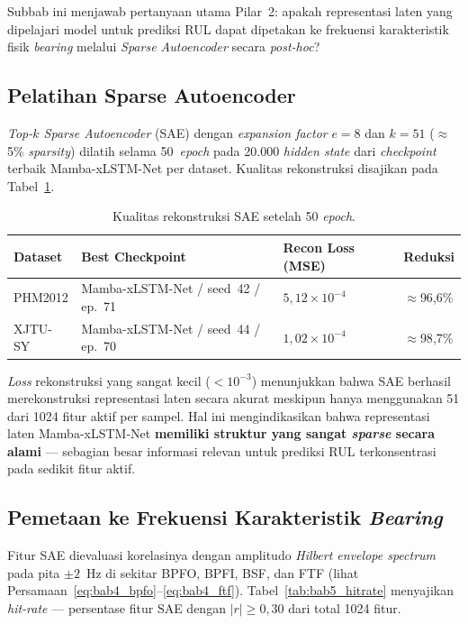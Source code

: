 Subbab ini menjawab pertanyaan utama Pilar~2: apakah representasi laten
yang dipelajari model untuk prediksi RUL dapat dipetakan ke frekuensi
karakteristik fisik \emph{bearing} melalui \emph{Sparse Autoencoder} secara
\emph{post-hoc}?

\subsection{Pelatihan Sparse Autoencoder}
\label{subsec:bab5_sae_training}

\emph{Top-$k$ Sparse Autoencoder} (SAE) dengan \emph{expansion factor}
$e = 8$ dan $k = 51$ (${\approx}$5\% \emph{sparsity}) dilatih selama
50~\emph{epoch} pada 20.000 \emph{hidden state} dari \emph{checkpoint}
terbaik Mamba-xLSTM-Net per dataset.
Kualitas rekonstruksi disajikan pada Tabel~\ref{tab:bab5_sae_recon}.

\begin{table}[ht]
\centering
\caption{Kualitas rekonstruksi SAE setelah 50 \emph{epoch}.}
\label{tab:bab5_sae_recon}
\small
\begin{tabular}{@{}llll@{}}
\toprule
\textbf{Dataset} & \textbf{Best Checkpoint} & \textbf{Recon Loss (MSE)} & \textbf{Reduksi} \\
\midrule
PHM2012  & Mamba-xLSTM-Net / seed~42 / ep.~71 & $5{,}12 \times 10^{-4}$ & $\approx$96{,}6\% \\
XJTU-SY & Mamba-xLSTM-Net / seed~44 / ep.~70 & $1{,}02 \times 10^{-4}$ & $\approx$98{,}7\% \\
\bottomrule
\end{tabular}
\end{table}

\emph{Loss} rekonstruksi yang sangat kecil ($< 10^{-3}$) menunjukkan bahwa SAE
berhasil merekonstruksi representasi laten secara akurat meskipun hanya
menggunakan 51 dari 1024 fitur aktif per sampel. Hal ini mengindikasikan
bahwa representasi laten Mamba-xLSTM-Net \textbf{memiliki struktur yang
sangat \emph{sparse} secara alami} --- sebagian besar informasi relevan
untuk prediksi RUL terkonsentrasi pada sedikit fitur aktif.

\subsection{Pemetaan ke Frekuensi Karakteristik \emph{Bearing}}
\label{subsec:bab5_bpfx}

Fitur SAE dievaluasi korelasinya dengan amplitudo \emph{Hilbert envelope
spectrum} pada pita $\pm 2$~Hz di sekitar BPFO, BPFI, BSF, dan FTF
(lihat Persamaan~\ref{eq:bab4_bpfo}--\ref{eq:bab4_ftf}).
Tabel~\ref{tab:bab5_hitrate} menyajikan \emph{hit-rate} --- persentase fitur
SAE dengan $|r| \geq 0{,}30$ dari total 1024 fitur.

